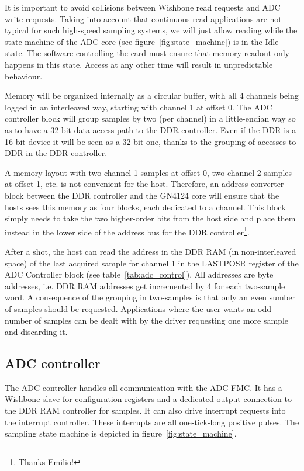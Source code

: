 \documentclass{article}
\begin{document}
It is important to avoid collisions between Wishbone read requests and ADC write requests. Taking into account that continuous read applications are not typical for such high-speed sampling systems, we will just allow reading while the state machine of the ADC core (see figure~\ref{fig:state_machine}) is in the Idle state. The software controlling the card must ensure that memory readout only happens in this state. Access at any other time will result in unpredictable behaviour. 

Memory will be organized internally as a circular buffer, with all 4 channels being logged in an interleaved way, starting with channel 1 at offset 0. The ADC controller block will group samples by two (per channel) in a little-endian way so as to have a 32-bit data access path to the DDR controller. Even if the DDR is a 16-bit device it will be seen as a 32-bit one, thanks to the grouping of accesses to DDR in the DDR controller.

A memory layout with two channel-1 samples at offset 0, two channel-2 samples at offset 1, etc. is not convenient for the host. Therefore, an address converter block between the DDR controller and the GN4124 core will ensure that the hosts sees this memory as four blocks, each dedicated to a channel. This block simply needs to take the two higher-order bits from the host side and place them instead in the lower side of the address bus for the DDR controller\footnote{Thanks Emilio!}.
 
After a shot, the host can read the address in the DDR RAM (in non-interleaved space) of the last acquired sample for channel 1 in the LASTPOSR register of the ADC Controller block (see table~\ref{tab:adc_control}). All addresses are byte addresses, i.e. DDR RAM addresses get incremented by 4 for each two-sample word. A consequence of the grouping in two-samples is that only an even sumber of samples should be requested. Applications where the user wants an odd number of samples can be dealt with by the driver requesting one more sample and discarding it. 

\subsection{ADC controller}
The ADC controller handles all communication with the ADC FMC. It has a Wishbone slave for configuration registers and a dedicated output connection to the DDR RAM controller for samples. It can also drive interrupt requests into the interrupt controller. These interrupts are all one-tick-long positive pulses. The sampling state machine is depicted in figure~\ref{fig:state_machine}. 
\end{document}
